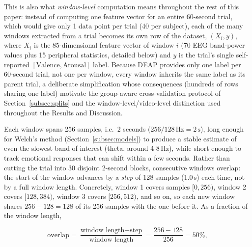 \documentclass[conference]{IEEEtran}
\begin{document}
This is also what \emph{window-level} computation means throughout the
rest of this paper: instead of computing one feature vector for an entire
60-second trial, which would give only 1 data point per trial (40 per
subject), each of the many windows extracted from a trial becomes its own
row of the dataset, $(X_i, y)$, where $X_i$ is the 85-dimensional feature
vector of window $i$ (70 EEG band-power values plus 15 peripheral
statistics, detailed below) and $y$ is the
trial's single self-reported $[\text{Valence}, \text{Arousal}]$ label.
Because DEAP provides only one label per 60-second trial, not one per
window, every window inherits the same label as its parent trial, a
deliberate simplification whose consequences (hundreds of rows sharing
one label) motivate the group-aware cross-validation protocol of
Section~\ref{subsec:splits} and the window-level/video-level distinction
used throughout the Results and Discussion.

Each window spans 256 samples, i.e.\ 2 seconds ($256 / 128\,\text{Hz} =
2\,\text{s}$), long enough for Welch's method (Section~\ref{subsec:models})
to produce a stable estimate of even the slowest band of interest (theta,
around 4-8\,Hz), while short enough to track emotional responses that can
shift within a few seconds. Rather than cutting the trial into 30
disjoint 2-second blocks, consecutive windows overlap: the start of the
window advances by a \emph{step} of 128 samples (1.0\,s) each time, not by
a full window length. Concretely, window 1 covers samples $[0, 256)$,
window 2 covers $[128, 384)$, window 3 covers $[256, 512)$, and so on, so
each new window shares $256 - 128 = 128$ of its 256 samples with the one
before it. As a fraction of the window length,

\begin{equation}
\text{overlap} = \frac{\text{window length} - \text{step}}{\text{window length}}
= \frac{256 - 128}{256} = 50\%,
\label{eq:overlap}
\end{equation}
\end{document}
